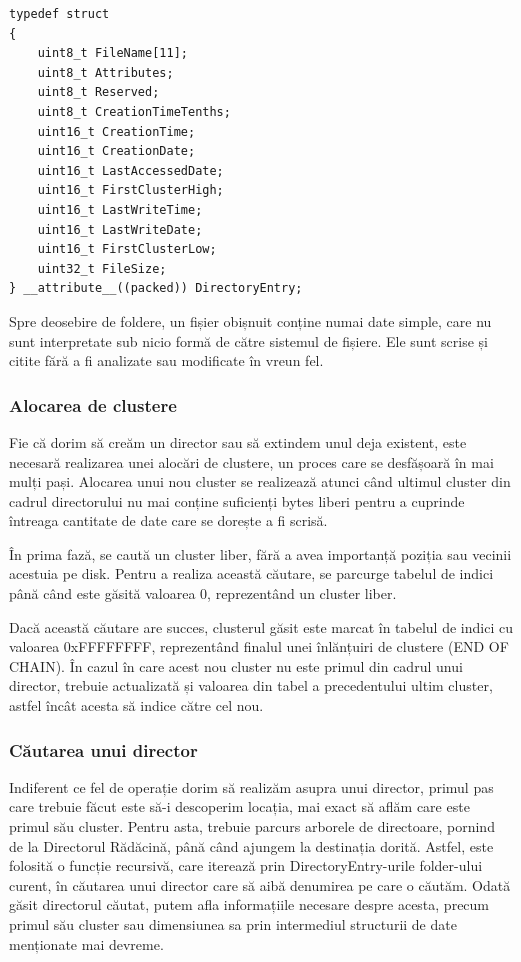 \bigskip

\lstset{style=code-snyppet-style}
\begin{lstlisting}
typedef struct
{
    uint8_t FileName[11];
    uint8_t Attributes;
    uint8_t Reserved;
    uint8_t CreationTimeTenths;
    uint16_t CreationTime;
    uint16_t CreationDate;
    uint16_t LastAccessedDate;
    uint16_t FirstClusterHigh;
    uint16_t LastWriteTime;
    uint16_t LastWriteDate;
    uint16_t FirstClusterLow;
    uint32_t FileSize;
} __attribute__((packed)) DirectoryEntry;
\end{lstlisting}

\bigskip

Spre deosebire de foldere, un fișier obișnuit conține numai date simple, care nu sunt interpretate sub nicio formă de către sistemul de fișiere. Ele sunt scrise și citite fără a fi analizate sau modificate în vreun fel.


\subsubsection{Alocarea de clustere}

Fie că dorim să creăm un director sau să extindem unul deja existent, este necesară realizarea unei alocări de clustere, un proces care se desfășoară în mai mulți pași. Alocarea unui nou cluster se realizează atunci când ultimul cluster din cadrul directorului nu mai conține suficienți bytes liberi pentru a cuprinde întreaga cantitate de date care se dorește a fi scrisă.

În prima fază, se caută un cluster liber, fără a avea importanță poziția sau vecinii acestuia pe disk. Pentru a realiza această căutare, se parcurge tabelul de indici până când este găsită valoarea 0, reprezentând un cluster liber.

Dacă această căutare are succes, clusterul găsit este marcat în tabelul de indici cu valoarea 0xFFFFFFFF, reprezentând finalul unei înlănțuiri de clustere (END OF CHAIN). În cazul în care acest nou cluster nu este primul din cadrul unui director, trebuie actualizată și valoarea din tabel a precedentului ultim cluster, astfel încât acesta să indice către cel nou.


\subsubsection{Căutarea unui director}

Indiferent ce fel de operație dorim să realizăm asupra unui director, primul pas care trebuie făcut este să-i descoperim locația, mai exact să aflăm care este primul său cluster. Pentru asta, trebuie parcurs arborele de directoare, pornind de la Directorul Rădăcină, până când ajungem la destinația dorită. Astfel, este folosită o funcție recursivă, care iterează prin DirectoryEntry-urile folder-ului curent, în căutarea unui director care să aibă denumirea pe care o căutăm. Odată găsit directorul căutat, putem afla informațiile necesare despre acesta, precum primul său cluster sau dimensiunea sa prin intermediul structurii de date menționate mai devreme.


